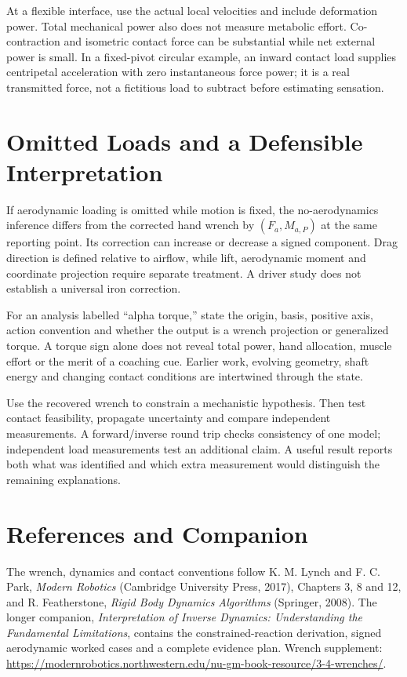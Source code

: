 \documentclass[11pt,a4paper]{article}
\begin{document}
At a flexible interface, use the actual local velocities and include deformation power. Total mechanical power also does not measure metabolic effort. Co-contraction and isometric contact force can be substantial while net external power is small. In a fixed-pivot circular example, an inward contact load supplies centripetal acceleration with zero instantaneous force power; it is a real transmitted force, not a fictitious load to subtract before estimating sensation.

\section{Omitted Loads and a Defensible Interpretation}
If aerodynamic loading is omitted while motion is fixed, the no-aerodynamics inference differs from the corrected hand wrench by $(F_a,M_{a,P})$ at the same reporting point. Its correction can increase or decrease a signed component. Drag direction is defined relative to airflow, while lift, aerodynamic moment and coordinate projection require separate treatment. A driver study does not establish a universal iron correction.

For an analysis labelled ``alpha torque,'' state the origin, basis, positive axis, action convention and whether the output is a wrench projection or generalized torque. A torque sign alone does not reveal total power, hand allocation, muscle effort or the merit of a coaching cue. Earlier work, evolving geometry, shaft energy and changing contact conditions are intertwined through the state.

Use the recovered wrench to constrain a mechanistic hypothesis. Then test contact feasibility, propagate uncertainty and compare independent measurements. A forward/inverse round trip checks consistency of one model; independent load measurements test an additional claim. A useful result reports both what was identified and which extra measurement would distinguish the remaining explanations.

\section*{References and Companion}
The wrench, dynamics and contact conventions follow K. M. Lynch and F. C. Park, \emph{Modern Robotics} (Cambridge University Press, 2017), Chapters 3, 8 and 12, and R. Featherstone, \emph{Rigid Body Dynamics Algorithms} (Springer, 2008). The longer companion, \emph{Interpretation of Inverse Dynamics: Understanding the Fundamental Limitations}, contains the constrained-reaction derivation, signed aerodynamic worked cases and a complete evidence plan. Wrench supplement: \url{https://modernrobotics.northwestern.edu/nu-gm-book-resource/3-4-wrenches/}.
\end{document}
